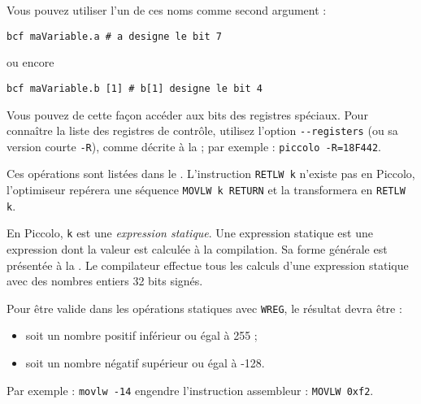 Vous pouvez utiliser l’un de ces noms comme second argument :
\begin{lstlisting}[language=piccolo]
bcf maVariable.a # a designe le bit 7
\end{lstlisting}
ou encore
\begin{lstlisting}[language=piccolo]
bcf maVariable.b [1] # b[1] designe le bit 4
\end{lstlisting}

Vous pouvez de cette façon accéder aux bits des registres spéciaux. Pour connaître la liste des registres de contrôle, utilisez l’option \texttt{-{}-registers} (ou sa version courte \texttt{-R}), comme décrite à la  ; par exemple : \texttt{piccolo -R=18F442}.



Ces opérations sont listées dans le . L’instruction \texttt{RETLW k} n’existe pas en Piccolo, l’optimiseur repérera une séquence \texttt{MOVLW k RETURN} et la transformera en \texttt{RETLW k}.

En Piccolo, \texttt{k} est une \emph{expression statique}. Une expression statique est une expression dont la valeur est calculée à la compilation. Sa forme générale est présentée à la . Le compilateur effectue tous les calculs d'une expression statique avec des nombres entiers 32 bits signés.

Pour être valide dans les opérations statiques avec \texttt{WREG}, le résultat devra être :
\begin{itemize}
  \item soit un nombre positif inférieur ou égal à 255 ;
  \item soit un nombre négatif supérieur ou égal à -128.
\end{itemize}

Par exemple : \texttt{movlw -14} engendre l’instruction assembleur : \texttt{MOVLW 0xf2}.


